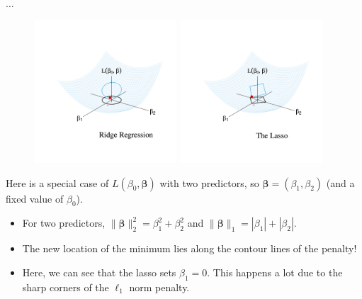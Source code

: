 \documentclass[8pt]{beamer}
\begin{document}
\begin{frame}{$\ldots$}

\begin{figure}
    \centering
    \includegraphics[trim = 50 50 0 50, clip, width = 0.475\textwidth]{min_ridge.pdf}
    \includegraphics[trim = 50 50 0 50, clip, width = 0.475\textwidth]{min_lasso.pdf}
\end{figure}

Here is a special case of $L(\beta_0, \bm{\beta})$ with two predictors, so $\bm{\beta} = (\beta_1,\beta_2)$ (and a fixed value of $\beta_0$).
\begin{itemize}
    \item For two predictors, $\| \bm{\beta} \|_2^2 = \beta_1^2 + \beta_2^2$ and $\| \bm{\beta} \|_1 = |\beta_1| + |\beta_2|$.
    \item The new location of the minimum lies along the contour lines of the penalty! 
    \item Here, we can see that the lasso sets $\beta_1 = 0$. This happens a lot due to the sharp corners of the $\ell_1$ norm penalty.
\end{itemize}
    
\end{frame}
\end{document}
